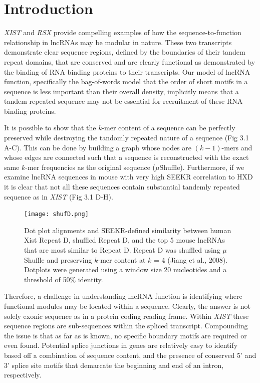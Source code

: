 \section{Introduction}
\emph{XIST} and \emph{RSX} provide compelling examples of how the sequence-to-function relationship in lncRNAs may be modular in nature. These two transcripts demonstrate clear sequence regions, defined by the boundaries of their tandem repeat domains, that are conserved and are clearly functional as demonstrated by the binding of RNA binding proteins to their transcripts. Our model of lncRNA function, specifically the bag-of-words model that the order of short motifs in a sequence is less important than their overall density, implicitly means that a tandem repeated sequence may not be essential for recruitment of these RNA binding proteins.

It is possible to show that the $k$-mer content of a sequence can be perfectly preserved while destroying the tandomly repeated nature of a sequence (Fig 3.1 A-C). This can be done by building a graph whose nodes are $(k-1)$-mers and whose edges are connected such that a sequence is reconstructed with the exact same $k$-mer frequencies as the original sequence ($\mu$Shuffle). Furthermore, if we examine lncRNA sequences in mouse with very high SEEKR correlation to HXD it is clear that not all these sequences contain substantial tandemly repeated sequence as in \emph{XIST} (Fig 3.1 D-H). 
\begin{figure}[h]
\centering
\texttt{[image: shufD.png]}
\caption{Dot plot alignments and SEEKR-defined similarity between human Xist Repeat D, shuffled Repeat D, and the top 5 mouse lncRNAs that are most similar to Repeat D. Repeat D was shuffled using $\mu$Shuffle and preserving $k$-mer content at $k$ = 4 (Jiang et al., 2008). Dotplots were generated using a window size 20 nucleotides and a threshold of 50\% identity.}
\label{fig:shufD}
\end{figure}

Therefore, a challenge in understanding lncRNA function is identifying where functional modules may be located within a sequence. Clearly, the answer is not solely exonic sequence as in a protein coding reading frame. Within \emph{XIST} these sequence regions are sub-sequences within the spliced transcript. Compounding the issue is that as far as is known, no specific boundary motifs are required or even found. Potential splice junctions in genes are relatively easy to identify based off a combination of sequence content, and the presence of conserved 5' and 3' splice site motifs that demarcate the beginning and end of an intron, respectively. 

